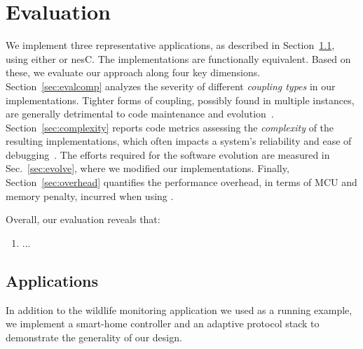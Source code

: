  \section{Evaluation}\label{sec:eval}

We implement three representative applications, as described in
Section~\ref{sec:scenarios}, using either \conesc or nesC. The implementations
are functionally equivalent. Based on these, we evaluate our approach along
four key dimensions. Section~\ref{sec:evalcomp} analyzes the severity of
different \emph{coupling types} in our implementations. Tighter forms of
coupling, possibly found in multiple instances, are generally detrimental to
code maintenance and evolution~\cite{stevens79}. Section~\ref{sec:complexity}
reports code metrics assessing the \emph{complexity} of the resulting
implementations, which often impacts a system's reliability and ease of
debugging~\cite{pressman01}. The efforts required for the software evolution are
measured in Sec.~\ref{sec:evolve}, where we modified our implementations.
Finally, Section~\ref{sec:overhead} quantifies the performance overhead, in
terms of MCU and memory penalty, incurred when using \conesc.

Overall, our evaluation reveals that:
\begin{enumerate}
\item ...
\end{enumerate}


\subsection{Applications}\label{sec:scenarios}

In addition to the wildlife monitoring application we used as a
running example, we implement a smart-home controller and an adaptive
protocol stack to demonstrate the generality of our design.

